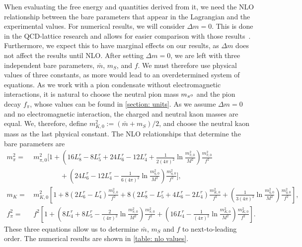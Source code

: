  When evaluating the free energy and quantities derived from it, we need the NLO relationship between the bare parameters that appear in the Lagrangian and the experimental values.
For numerical results, we will consider $\Delta m = 0$.
This is done in the QCD-lattice research and allows for easier comparison with those results~\autocite{brandtNewClassCompact2018}.
Furthermore, we expect this to have marginal effects on our results, as $\Delta m$ does not affect the results until NLO.
After setting $\Delta m = 0$, we are left with three independent bare parameters, $\bar m$, $m_S$, and $f$.
We must therefore use physical values of three constants, as more would lead to an overdetermined system of equations.
As we work with a pion condensate without electromagnetic interactions, it is natural to choose the neutral pion mass $m_{\pi^0}$ and the pion decay $f_\pi$, whose values can be found in \autoref{section: units}.
As we assume $\Delta m = 0$ and no electromagnetic interaction, the charged and neutral kaon masses are equal.
We, therefore, define $m_{K,0}^2 := (\bar m + m_S)/2$, and choose the neutral kaon mass as the last physical constant.
The NLO relationships that determine the bare parameters are~\autocite{gasserChiralPerturbationTheory1985}
%
\begin{align}
    \nonumber
    m_\pi^2 
    =&\, 
    m_{\pi,0}^2
    \Bigg[
        1
        +
        \left(
            16L_8^r - 8L_5^r + 24L_6^r - 12L_4^r
            +
            \frac{1}{2(4\pi)^2}
            \ln\frac{m_{\pi,0}^2}{M^2}
        \right)\frac{m_{\pi,0}^2}{f^2}\\ 
        & \quad \quad \quad \quad
        +
        \left(
            24L_6^r - 12L_4^r
            -
            \frac{1}{6(4\pi)^2}
            \ln\frac{m_{\eta,0}^2}{M^2}
        \right)\frac{m_{\eta,0}^2}{f^2}
    \Bigg], \\
    m_{K}
    =&\,
    m_{K,0}^2
    \left[
        1
        + 8\left(2L_6^r - L_4^r\right) \frac{m_{\pi,0}^2}{f^2}
        + 8\left(2L_8^r - L_5^r + 4L_6^r- 2L_4^r\right) \frac{m_{K,0}^2}{f^2}
        +
        \left(        
            \frac{1}{3(4 \pi)^2} 
            \ln\frac{m_{\eta,0}^2}{M^2}
        \right)
        \frac{m_{\eta,0}^2}{f^2}
    \right],\\
    f_\pi^2
    =&\, f^2
    \left[
        1
        + 
        \left(
            8 L_4^r + 8 L_5^r - \frac{2}{(4\pi)^2} \ln\frac{m_{\pi,0}^2}{M^2}
        \right) \frac{m_{\pi,0}^2}{f^2}
        +
        \left(
            16 L_4^r
            - \frac{1}{(4\pi)^2} \ln\frac {m_{K,0}^2}{M^2}
        \right) \frac{m_{K,0}^2}{f^2}
    \right].
\end{align}
%
These three equations allow us to determine $\bar m$, $m_S$ and $f$ to next-to-leading order.
The numerical results are shown in \autoref{table: nlo values}.

